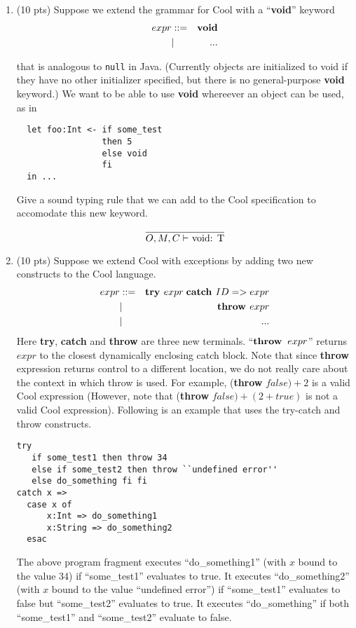 \documentclass[10pt]{article}
\newcommand{\infertext}[2]{\infer{{\textrm{#1}}}{#2}}
\begin{document}
\begin{enumerate}
\medskip
\item (10 pts) Suppose we extend the grammar for Cool with a ``{\bf void}'' keyword
\begin{eqnarray*}
  expr & ::= & {\bf void} \\
       & |   & ...
\end{eqnarray*}

  that is analogous to {\tt null} in Java. (Currently objects are
  initialized to void if they have no other initializer specified, but
  there is no general-purpose {\bf void} keyword.)  We want to be able
  to use {\bf void} whereever an object can be used, as in
\begin{verbatim}
  let foo:Int <- if some_test
                 then 5
                 else void
                 fi
  in ...
\end{verbatim}

  Give a sound typing rule that we can add to the Cool specification
  to accomodate this new keyword.

  \[
  \infertext
    {$O,M,C \vdash$ void: T}
    {}
  \]

\medskip
\item  (10 pts) Suppose we extend Cool with exceptions by adding two new constructs
to the Cool language.
\begin{eqnarray*}
  expr & ::= & \textit{\bf try } expr \;\textit{\bf catch } ID => expr \\
       & |   & \textit{\bf throw } expr \\
       & | & ...
\end{eqnarray*}
Here {\bf try}, {\bf catch} and {\bf throw} are three new terminals.
  ``${\bf throw }\;\; expr$'' returns $expr$ to the
  closest dynamically enclosing catch block.
Note that since {\bf throw} expression returns control to a different location, we do not really
  care about the context in which throw is used. For example,
({\bf throw} $false) + 2$ is a valid Cool expression (However, note that
  ({\bf throw} $false) + (2+true)$ is not a valid Cool expression).  Following is an example that uses the
try-catch and throw constructs.
\begin{verbatim}
try
   if some_test1 then throw 34
   else if some_test2 then throw ``undefined error''
   else do_something fi fi
catch x =>
  case x of
      x:Int => do_something1
      x:String => do_something2
  esac
\end{verbatim}

The above program fragment executes
  ``do\_something1'' (with $x$ bound to the value 34) if ``some\_test1''
  evaluates to \textsf{true}. It executes ``do\_something2'' (with $x$ bound to the
  value ``undefined error'') if ``some\_test1'' evaluates to \textsf{false} but
  ``some\_test2'' evaluates to \textsf{true}. It executes ``do\_something'' if both
  ``some\_test1'' and ``some\_test2'' evaluate to \textsf{false}.



\end{enumerate}
\end{document}
